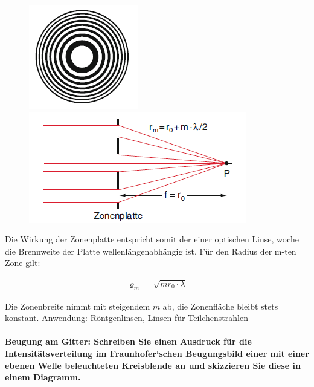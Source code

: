 \documentclass[a4paper, 11pt, ngerman, parskip=half-]{scrartcl}
\newcommand{\myparagraph}[1]{\paragraph{#1}\mbox{}\\}
\begin{document}
    \begin{figure}[H]
        \begin{minipage}{.47\textwidth}
            \centering
            \includegraphics[width=0.5\linewidth]{image/19/5.1}

        \end{minipage}%
        \hfill%
        \begin{minipage}{.47\textwidth}
            \centering
            \includegraphics[width=0.92\linewidth]{image/19/5.2}
        \end{minipage}
    \end{figure}

    Die Wirkung der Zonenplatte entspricht somit der einer optischen Linse, woche die Brennweite der Platte wellenlängenabhängig ist. Für den Radius der m-ten Zone gilt:

    \begin{align*}
        \varrho_m = \sqrt{m r_0 \cdot \lambda}
    \end{align*}

    Die Zonenbreite nimmt mit steigendem $m$ ab, die Zonenfläche bleibt stets konstant.
    Anwendung: Röntgenlinsen, Linsen für Teilchenstrahlen

    \myparagraph{Beugung am Gitter: Schreiben Sie einen Ausdruck für die Intensitätsverteilung im
        Fraunhofer‘schen Beugungsbild einer mit einer ebenen Welle beleuchteten Kreisblende an
        und skizzieren Sie diese in einem Diagramm.}
\end{document}
